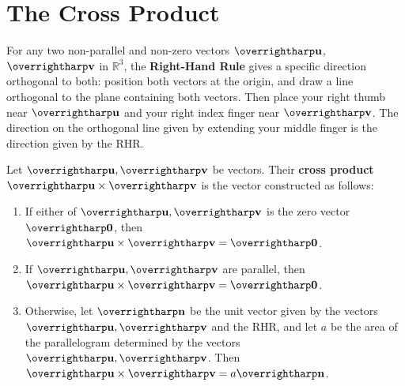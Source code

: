 \documentclass[letterpaper, twoside, 12pt]{book}
\begin{document}
\setcounter{chapter}{10}
\setcounter{section}{3}


\section{The Cross Product}

\begin{definition}
  For any two non-parallel and non-zero vectors $\harpvec{u}$, $\harpvec{v}$
  in $\mathbb R^3$,
  the \textbf{Right-Hand Rule} gives a specific direction orthogonal to both:
  position both vectors at the origin, and draw a line orthogonal to the
  plane containing both vectors. Then place your right thumb near
  $\harpvec{u}$ and your right index finger near $\harpvec{v}$.
  The direction on the orthogonal line given by extending your middle
  finger is the direction given by the RHR.
\end{definition}

\begin{definition}
  Let \(\harpvec u,\harpvec v\) be vectors.
  Their \textbf{cross product} $\harpvec{u}\times\harpvec{v}$ is the vector
  constructed as follows:
  \begin{enumerate}
    \item If either of \(\harpvec u,\harpvec v\) is the zero vector
      \(\harpvec 0\), then \(\harpvec u\times\harpvec v=\harpvec 0\).
    \item If \(\harpvec u,\harpvec v\) are parallel,
      then \(\harpvec u\times\harpvec v=\harpvec 0\).
    \item Otherwise, let \(\harpvec n\) be the unit vector given by the
     vectors \(\harpvec u,\harpvec v\) and the RHR, and let \(a\) be the area
     of the parallelogram determined by the vectors \(\harpvec u,\harpvec v\).
     Then \(\harpvec u\times\harpvec v=a\harpvec n\).
  \end{enumerate}

\end{definition}
\end{document}
